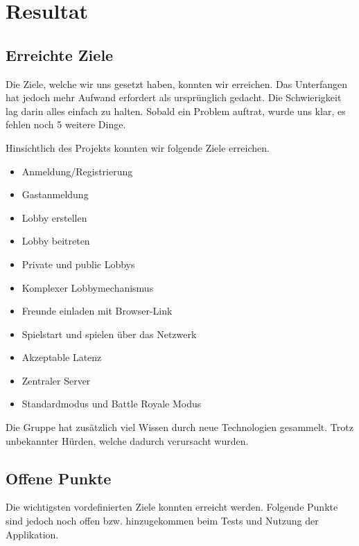 \documentclass[11pt,ngerman]{article}
\begin{document}
    \section{Resultat}

    \subsection{Erreichte Ziele}

    Die Ziele, welche wir uns gesetzt haben, konnten wir erreichen. Das Unterfangen hat jedoch mehr Aufwand erfordert als ursprünglich gedacht. Die Schwierigkeit lag darin alles einfach zu halten. Sobald ein Problem auftrat, wurde uns klar, es fehlen noch 5 weitere Dinge.

    Hinsichtlich des Projekts konnten wir folgende Ziele erreichen.

	\begin{itemize}
		\item Anmeldung/Registrierung
		\item Gastanmeldung
		\item Lobby erstellen
		\item Lobby beitreten
		\item Private und public Lobbys
		\item Komplexer Lobbymechanismus
		\item Freunde einladen mit Browser-Link
		\item Spielstart und spielen über das Netzwerk
		\item Akzeptable Latenz
		\item Zentraler Server
		\item Standardmodus und Battle Royale Modus
	\end{itemize}
    Die Gruppe hat zusätzlich viel Wissen durch neue Technologien gesammelt. Trotz unbekannter Hürden, welche dadurch verursacht wurden.

    \subsection{Offene Punkte}
    Die wichtigsten vordefinierten Ziele konnten erreicht werden. Folgende Punkte sind jedoch noch offen bzw. hinzugekommen beim Tests und Nutzung der Applikation.
\end{document}
